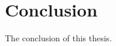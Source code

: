 \chapter{Conclusion}	
\label{chapter5}

\begin{paragraph}
The conclusion of this thesis.
\end{paragraph}
